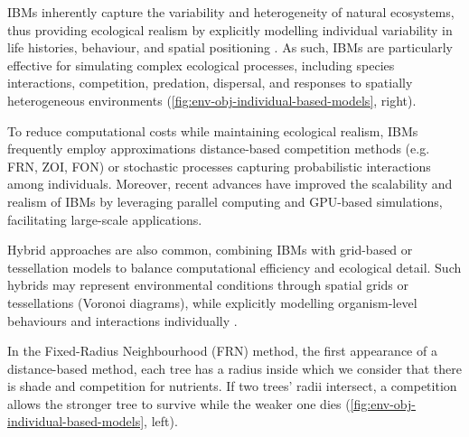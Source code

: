 IBMs inherently capture the variability and heterogeneity of natural ecosystems, thus providing ecological realism by explicitly modelling individual variability in life histories, behaviour, and spatial positioning \cite{McLane2011,Zhang2020}. As such, IBMs are particularly effective for simulating complex ecological processes, including species interactions, competition, predation, dispersal, and responses to spatially heterogeneous environments (\cref{fig:env-obj-individual-based-models}, right).

To reduce computational costs while maintaining ecological realism, IBMs frequently employ approximations distance-based competition methods (e.g. FRN, ZOI, FON) or stochastic processes capturing probabilistic interactions among individuals. Moreover, recent advances have improved the scalability and realism of IBMs by leveraging parallel computing and GPU-based simulations, facilitating large-scale applications.

Hybrid approaches are also common, combining IBMs with grid-based or tessellation models to balance computational efficiency and ecological detail. Such hybrids may represent environmental conditions through spatial grids or tessellations (Voronoi diagrams), while explicitly modelling organism-level behaviours and interactions individually \cite{Chng2011a}.


In the Fixed-Radius Neighbourhood (FRN) method, the first appearance of a distance-based method, each tree has a radius inside which we consider that there is shade and competition for nutrients. If two trees' radii intersect, a competition allows the stronger tree to survive while the weaker one dies (\cref{fig:env-obj-individual-based-models}, left).

